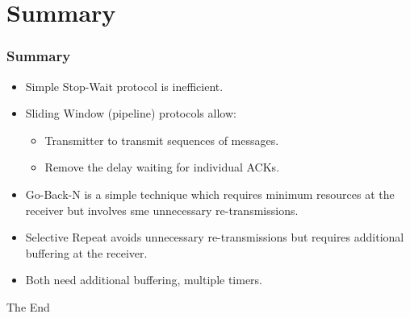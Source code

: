 \documentclass{beamer}
\begin{document}
\section{Summary}
\begin{frame}
\frametitle{Summary}
\begin{itemize}
\item Simple Stop-Wait protocol is inefficient.
\item Sliding Window (pipeline) protocols allow:
\begin{itemize}
\item Transmitter to transmit sequences of messages.
\item Remove the delay waiting for individual ACKs.
\end{itemize}
\item Go-Back-N is a simple technique which requires minimum resources at the receiver but involves sme unnecessary re-transmissions.
\item Selective Repeat avoids unnecessary re-transmissions but requires additional buffering at the receiver.
\item Both need additional buffering, multiple timers.
\end{itemize}
\end{frame}
\begin{frame} 
\Huge{\centerline{The End}}
\end{frame}
\end{document}
